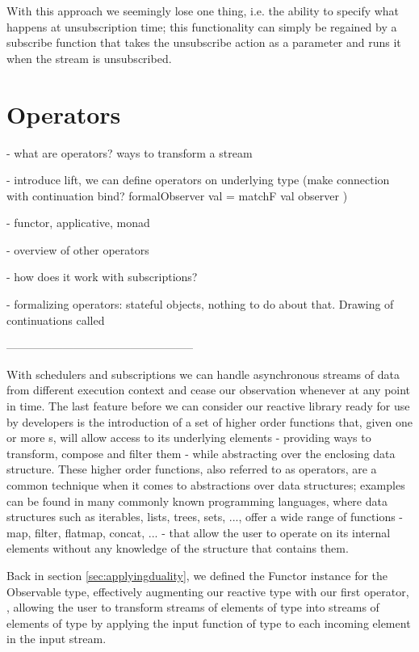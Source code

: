 With this approach we seemingly lose one thing, i.e. the ability to specify what happens at unsubscription time; this functionality can simply be regained by a subscribe function that takes the unsubscribe action as a parameter and runs it when the stream is unsubscribed.

\section{Operators}
\label{operators}

- what are operators? ways to transform a stream

- introduce lift, we can define operators on underlying type (make connection with continuation bind? formalObserver val = matchF val observer )

- functor, applicative, monad

- overview of other operators

- how does it work with subscriptions?

- formalizing operators: stateful objects, nothing to do about that. Drawing of continuations called


--------------------------------------------------

With schedulers and subscriptions we can handle asynchronous streams of data from different execution context and cease our observation whenever at any point in time. The last feature before we can consider our reactive library ready for use by developers is the introduction of a set of higher order functions that, given one or more s, will allow access to its underlying elements - providing ways to transform, compose and filter them - while abstracting over the enclosing data structure. These higher order functions, also referred to as operators, are a common technique when it comes to abstractions over data structures; examples can be found in many commonly known programming languages, where data structures such as iterables, lists, trees, sets, ..., offer a wide range of functions - map, filter, flatmap, concat, ... - that allow the user to operate on its internal elements without any knowledge of the structure that contains them.

Back in section \ref{sec:applyingduality}, we defined the Functor instance for the Observable type, effectively augmenting our reactive type with our first operator, , allowing the user to transform streams of elements of type  into streams of elements of type  by applying the input function of type  to each incoming element in the input stream.

